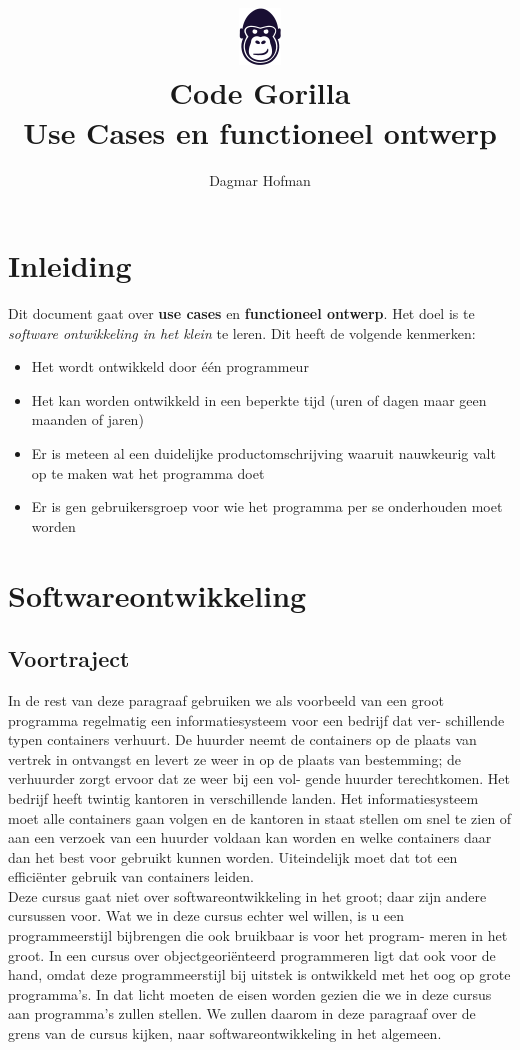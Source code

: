 \documentclass{article}
\title{ \includegraphics[scale=1]{gorilla.png} \\ Code Gorilla \\ Use Cases en functioneel ontwerp}
\author{Dagmar Hofman}
\date{}
\begin{document}
	\maketitle
	\newpage
	\tableofcontents
	\newpage
	\section{Inleiding}
	Dit document gaat over \textbf{use cases} en  \textbf{functioneel ontwerp}. Het doel is te \textit{software ontwikkeling in het klein} te leren. Dit heeft de volgende kenmerken: \\
	\begin{itemize}
		\item Het wordt ontwikkeld door \'{e}\'{e}n programmeur
		\item Het kan worden ontwikkeld in een beperkte tijd (uren of dagen maar geen maanden of jaren)
		\item Er is meteen al een duidelijke productomschrijving waaruit nauwkeurig valt op te maken wat het programma doet
		\item Er is gen gebruikersgroep voor wie het programma per se onderhouden moet worden
	\end{itemize}

	\section{Softwareontwikkeling}
	
	\subsection{Voortraject}
	
	In de rest van deze paragraaf gebruiken we als voorbeeld van een groot
	programma regelmatig een informatiesysteem voor een bedrijf dat ver-
	schillende typen containers verhuurt. De huurder neemt de containers
	op de plaats van vertrek in ontvangst en levert ze weer in op de plaats
	van bestemming; de verhuurder zorgt ervoor dat ze weer bij een vol-
	gende huurder terechtkomen. Het bedrijf heeft twintig kantoren in
	verschillende landen. Het informatiesysteem moet alle containers gaan
	volgen en de kantoren in staat stellen om snel te zien of aan een verzoek
	van een huurder voldaan kan worden en welke containers daar dan
	het best voor gebruikt kunnen worden. Uiteindelijk moet dat tot een
	efficiënter gebruik van containers leiden. \\
	Deze cursus gaat niet over softwareontwikkeling in het groot; daar zijn
	andere cursussen voor. Wat we in deze cursus echter wel willen, is u
	een programmeerstijl bijbrengen die ook bruikbaar is voor het program-
	meren in het groot. In een cursus over objectgeoriënteerd programmeren
	ligt dat ook voor de hand, omdat deze programmeerstijl bij uitstek is
	ontwikkeld met het oog op grote programma’s. In dat licht moeten de
	eisen worden gezien die we in deze cursus aan programma’s zullen
	stellen. We zullen daarom in deze paragraaf over de grens van de
	cursus kijken, naar softwareontwikkeling in het algemeen. \\
\end{document}
